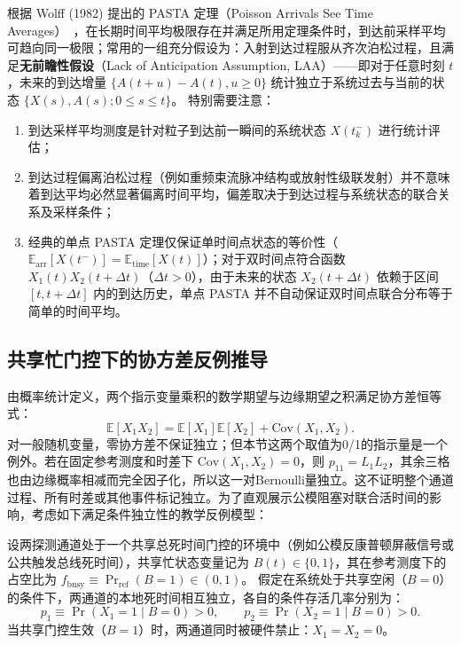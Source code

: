 根据 Wolff (1982) 提出的 PASTA 定理（Poisson Arrivals See Time Averages）~\cite{wolff-1982-poisson-arrivals-see-time-averages}，在长期时间平均极限存在并满足所用定理条件时，到达前采样平均可趋向同一极限；常用的一组充分假设为：入射到达过程服从齐次泊松过程，且满足\textbf{无前瞻性假设}（Lack of Anticipation Assumption, LAA）——即对于任意时刻 $t$，未来的到达增量 $\{A(t+u) - A(t), u \ge 0\}$ 统计独立于系统过去与当前的状态 $\{X(s), A(s); 0 \le s \le t\}$。
特别需要注意：
\begin{enumerate}
\item 到达采样平均测度是针对粒子到达前一瞬间的系统状态 $X(t_k^-)$ 进行统计评估；
\item 到达过程偏离泊松过程（例如重频束流脉冲结构或放射性级联发射）并不意味着到达平均必然显著偏离时间平均，偏差取决于到达过程与系统状态的联合关系及采样条件；
\item 经典的单点 PASTA 定理仅保证单时间点状态的等价性（$\mathbb{E}_{\mathrm{arr}}[X(t^-)]=\mathbb{E}_{\mathrm{time}}[X(t)]$）；对于双时间点符合函数 $X_1(t) X_2(t+\Delta t)$（$\Delta t > 0$），由于未来的状态 $X_2(t+\Delta t)$ 依赖于区间 $[t, t+\Delta t]$ 内的到达历史，单点 PASTA 并不自动保证双时间点联合分布等于简单的时间平均。
\end{enumerate}

\subsection{共享忙门控下的协方差反例推导}

由概率统计定义，两个指示变量乘积的数学期望与边缘期望之积满足协方差恒等式：
\begin{equation}\label{eq:appE-cov-identity}
\mathbb{E}[X_1 X_2] = \mathbb{E}[X_1] \mathbb{E}[X_2] + \mathrm{Cov}(X_1, X_2).
\end{equation}
对一般随机变量，零协方差不保证独立；但本节这两个取值为0/1的指示量是一个例外。若在固定参考测度和时差下 $\mathrm{Cov}(X_1,X_2)=0$，则 $p_{11}=L_1L_2$，其余三格也由边缘概率相减而完全因子化，所以这一对Bernoulli量独立。这不证明整个通道过程、所有时差或其他事件标记独立。为了直观展示公模阻塞对联合活时间的影响，考虑如下满足条件独立性的教学反例模型：

设两探测通道处于一个共享总死时间门控的环境中（例如公模反康普顿屏蔽信号或公共触发总线死时间），共享忙状态变量记为 $B(t) \in \{0, 1\}$，其在参考测度下的占空比为 $f_{\mathrm{busy}} \equiv \Pr_{\mathrm{ref}}(B = 1) \in (0, 1)$。
假定在系统处于共享空闲（$B = 0$）的条件下，两通道的本地死时间相互独立，各自的条件存活几率分别为：
\begin{equation}\label{eq:appE-cond-prob}
p_1 \equiv \Pr(X_1 = 1 \mid B = 0) > 0, \qquad p_2 \equiv \Pr(X_2 = 1 \mid B = 0) > 0.
\end{equation}
当共享门控生效（$B = 1$）时，两通道同时被硬件禁止：$X_1 = X_2 = 0$。

